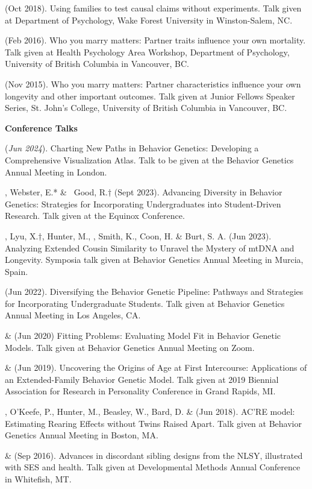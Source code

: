 \begin{etaremune}
%
\item\meb (Oct 2018). Using families to test causal claims without experiments. Talk given at Department of Psychology, Wake Forest University in Winston-Salem, NC.
%
\item \meb (Feb 2016). Who you marry matters: Partner traits influence your own mortality. Talk given at Health Psychology Area Workshop, Department of Psychology, University of British Columbia in Vancouver, BC. 
%
\item \meb (Nov 2015). Who you marry matters: Partner characteristics influence your own longevity and other important outcomes. Talk given at Junior Fellows Speaker Series, St. John's College, University of British Columbia in Vancouver, BC. \smallskip
\end{etaremune}%
{\large {\bf Conference Talks}}\begin{etaremune}
\item \meb (\textit{Jun 2024}). Charting New Paths in Behavior Genetics: Developing a Comprehensive \R Visualization Atlas. Talk to be given at the Behavior Genetics Annual Meeting in London.

\item \meb, Webster, E.* \& \ Good, R.$\dagger$ (Sept 2023). Advancing Diversity in Behavior Genetics: Strategies for Incorporating Undergraduates into Student-Driven Research. Talk given at the Equinox Conference.

\item \meb, Lyu, X.$\dagger$, Hunter, M.,  \Joe, Smith, K., Coon, H. \& Burt, S. A. (Jun 2023). Analyzing Extended Cousin Similarity to Unravel the Mystery of mtDNA and Longevity. Symposia talk given at Behavior Genetics Annual Meeting in Murcia, Spain.

\item \meb (Jun 2022). Diversifying the Behavior Genetic Pipeline: Pathways and Strategies for Incorporating Undergraduate Students. Talk given at Behavior Genetics Annual Meeting in Los Angeles, CA.

\item \meb \& \Joe (Jun 2020) Fitting Problems: Evaluating Model Fit in Behavior Genetic Models. Talk given at Behavior Genetics Annual Meeting on Zoom.
%
\item \meb \& \Joe (Jun 2019). Uncovering the Origins of Age at First Intercourse: Applications of an Extended-Family Behavior Genetic Model. Talk given at 2019 Biennial Association for Research in Personality Conference in Grand Rapids, MI.
%
\item\meb, O'Keefe, P., Hunter, M., Beasley, W., Bard, D. \& \Joe (Jun 2018). AC'RE model: Estimating Rearing Effects without Twins Raised Apart. Talk given at Behavior Genetics Annual Meeting in Boston, MA.
%
\item\meb \& \joe (Sep 2016). Advances in discordant sibling designs from the NLSY, illustrated with SES and health. Talk given at Developmental Methods Annual Conference in Whitefish, MT.%
%
\end{etaremune}
